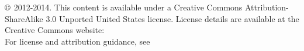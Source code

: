 \chapter*{}
\vfill


\noindent $\copyright$ 2012-2014. This content is available under a Creative Commons Attribution-ShareAlike 3.0 Unported United States license. License details are available at the Creative Commons website:  \\

\noindent For license and attribution guidance, see 

